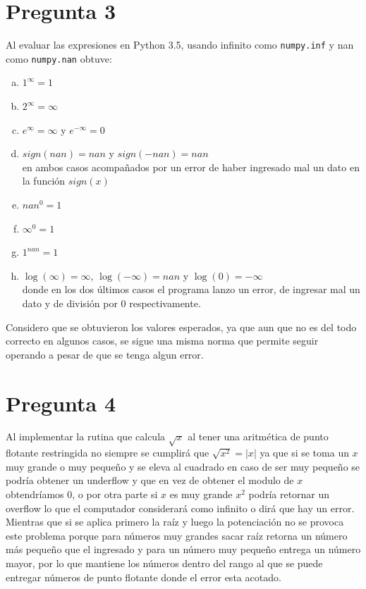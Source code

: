 \documentclass{article}
\begin{document}
\section*{Pregunta 3}
Al evaluar las expresiones en Python 3.5, usando infinito como \texttt{numpy.inf} y nan como \texttt{numpy.nan}	obtuve:
\begin{enumerate}[a)]
\item $1^{\infty}=1$
\item $2^{\infty}= \infty$
\item $e^{\infty}=\infty$ y $e^{-\infty}=0$
\item $sign(nan) = nan$ y $sign(-nan)= nan$\\ en ambos casos acompañados por un error de haber ingresado mal un dato en la función $sign(x)$
\item $nan^{0}=1$
\item $\infty^{0}=1$
\item $1^{nan}=1$
\item $\log(\infty)= \infty$, $\log(-\infty)= nan$ y $\log(0)= -\infty$\\ donde en los dos últimos casos el programa lanzo un error, de ingresar mal un dato y de división por 0 respectivamente.
\end{enumerate}
Considero que se obtuvieron los valores esperados, ya que aun que no es del todo correcto en algunos casos, se sigue una misma norma que permite seguir operando a pesar de que se tenga algun error.
\section*{Pregunta 4}
Al implementar la rutina que calcula $\sqrt{x}$ al tener una aritmética de punto flotante restringida no siempre se cumplirá que $\sqrt{x^{2}}=|x|$ ya que si se toma un $x$ muy grande o muy pequeño y se eleva al cuadrado en caso de ser muy pequeño se podría obtener un underflow y que en vez de obtener el modulo de $x$ obtendríamos $0$, o por otra parte si $x$ es muy grande $x^{2}$ podría retornar un overflow lo que el computador considerará como infinito o dirá que hay un error.\\
Mientras que si se aplica primero la raíz y luego la potenciación no se provoca este problema porque para números muy grandes sacar raíz retorna un número más pequeño que el ingresado y para un número muy pequeño entrega un número mayor, por lo que mantiene los números dentro del rango al que se puede entregar números de punto flotante donde el error esta acotado.\\
\end{document}
